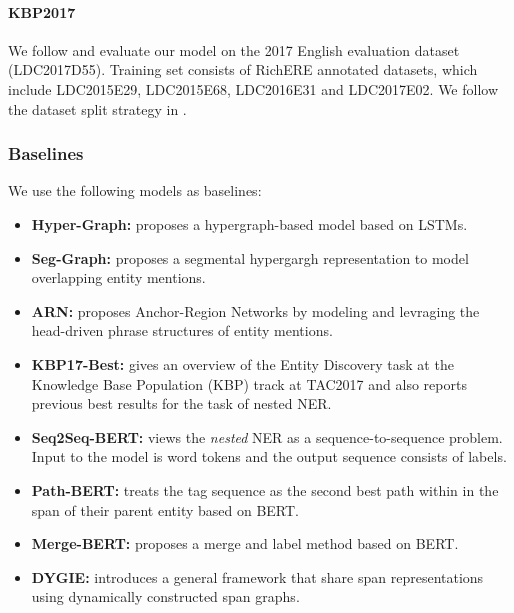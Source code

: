 \documentclass[11pt,a4paper]{article}
\newenvironment{tightitemize}{\begin{itemize}[topsep=0pt, partopsep=0pt] \setlength{\itemsep}{0pt}\setlength{\parskip}{0pt}}{\end{itemize}}
\begin{document}
\paragraph{KBP2017} We follow  and evaluate our model on the 2017 English evaluation dataset (LDC2017D55). 
Training set consists of RichERE annotated datasets, which include LDC2015E29, LDC2015E68, LDC2016E31 and LDC2017E02. 
We follow 
 the dataset split strategy in  .   


\subsubsection{Baselines} 
We use the following models as baselines:
\begin{tightitemize}
\item {\bf Hyper-Graph:}  proposes a hypergraph-based model based on LSTMs. 
\item {\bf Seg-Graph:}  proposes a  segmental hypergargh representation to model overlapping entity mentions. 
\item {\bf ARN:}  proposes Anchor-Region Networks by modeling and levraging the head-driven phrase structures of entity mentions. 
\item {\bf KBP17-Best:}  gives an overview of the Entity Discovery task at the Knowledge Base Population (KBP) track at TAC2017 and also reports previous best results for the task of nested NER. 
\item {\bf Seq2Seq-BERT:}  views the {\em nested} NER as a sequence-to-sequence problem. Input to the model is word tokens and the output sequence consists of labels.  
\item {\bf Path-BERT:}  treats the tag sequence as the second best path within in the span of their parent entity based on BERT. 
\item {\bf Merge-BERT:}  proposes a merge and label method based on BERT. 
\item {\bf DYGIE:}  introduces a general framework that share span representations using dynamically constructed span graphs. 
\end{tightitemize}
\end{document}

